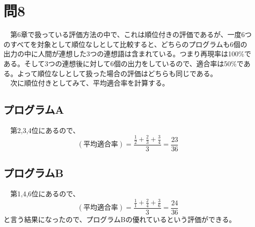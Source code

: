 \documentclass[a4j]{jarticle} %
\begin{document}
\section*{問8}
　第6章で扱っている評価方法の中で、これは順位付きの評価であるが、一度6つのすべてを対象として順位なしとして比較すると、どちらのプログラムも6個の出力の中に人間が連想した3つの連想語は含まれている。つまり再現率は100\%である。そして3つの連想後に対して6個の出力をしているので、適合率は50\%である。よって順位なしとして扱った場合の評価はどちらも同じである。\\
　次に順位付きとしてみて、平均適合率を計算する。
\subsection*{プログラムA}
　第2,3,4位にあるので、
\begin{equation}
  (平均適合率) = \dfrac{\tfrac{1}{2}+\tfrac{2}{3}+\tfrac{3}{4}}{3} = \dfrac{23}{36}
\end{equation}
\subsection*{プログラムB}
　第1,4,6位にあるので、
\begin{equation}
  (平均適合率) = \dfrac{\tfrac{1}{1}+\tfrac{2}{4}+\tfrac{3}{6}}{3} = \dfrac{24}{36}
\end{equation}
と言う結果になったので、プログラムBの優れているという評価ができる。
\end{document}
